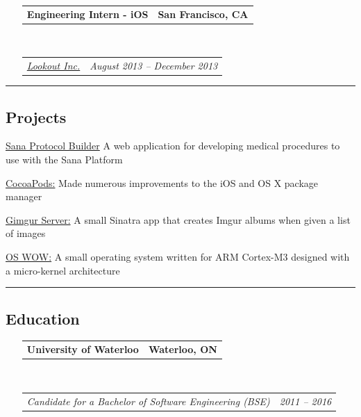 \documentclass[10pt,letterpaper]{article}
\makeatletter
\newenvironment{indentsection}[1]%
{\begin{list}{}%
	{\setlength{\leftmargin}{#1}}%
	\item[]%
}
{\end{list}}
\newcommand{\headerrow}[2]
{\begin{tabular*}{\linewidth}{l@{\extracolsep{\fill}}r}
	#1 &
	#2 \\
\end{tabular*}}
\makeatother
\begin{document}
\begin{itemize}[leftmargin=*]
	\item[]
	\headerrow
		{\textbf{Engineering Intern - iOS}}
		{\textbf{San Francisco, CA}}
	\\
	\headerrow
		{\emph{\href{https://www.lookout.com}{Lookout Inc.}}}
		{\emph{August 2013 -- December 2013}}
\end{itemize}

\hrule
\vspace{-0.4em}
\subsection*{Projects}
	\begin{indentsection}{\parindent}
	\begin{description*}
	    \item[\href{https://github.com/SanaMobile/sana.protocol_builder}{Sana Protocol Builder}] A web application for developing medical procedures to use with the Sana Platform
	    \item[\href{https://github.com/CocoaPods}{CocoaPods:}] Made numerous improvements to the iOS and OS X package manager
		\item[\href{https://github.com/Kapin/gimgur-server}{Gimgur Server:}] A small Sinatra app that creates Imgur albums when given a list of images
		\item[\href{https://github.com/Trinovantes/se350-project}{OS WOW:}] A small operating system written for ARM Cortex-M3 designed with a micro-kernel architecture
	\end{description*}
	\end{indentsection}

\hrule
\vspace{-0.4em}
\subsection*{Education}

\begin{itemize}[leftmargin=*]
	\parskip=0.1em

	\item[] 
	\headerrow
		{\textbf{University of Waterloo}}
		{\textbf{Waterloo, ON}}
	\\
	\headerrow
		{\emph{Candidate for a Bachelor of Software Engineering (BSE)}}
		{\emph{2011 -- 2016}}

\end{itemize}
\end{document}
